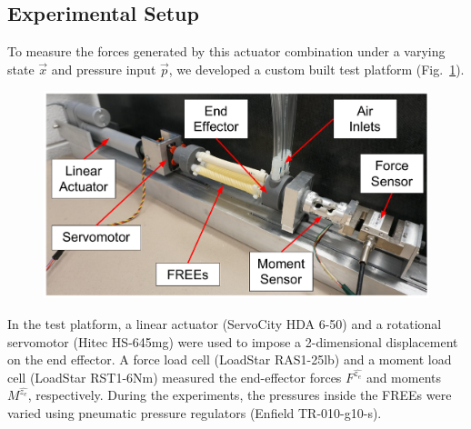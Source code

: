 \subsection{Experimental Setup}
To measure the forces generated by this actuator combination under a varying state $\vec{x}$ and pressure input $\vec{p}$, we developed a custom built test platform (Fig.~\ref{fig:rig}). 
%
\begin{figure}
    \centering
    \includegraphics[width=0.9\linewidth]{figures/photos/rig_labeled.pdf}
    \caption{}
    \label{fig:rig}
\end{figure}
%
In the test platform, a linear actuator (ServoCity HDA 6-50) and a rotational servomotor (Hitec HS-645mg) were used to impose a 2-dimensional displacement on the end effector. 
A force load cell (LoadStar  RAS1-25lb) and a moment load cell (LoadStar RST1-6Nm) measured the end-effector forces $F^{\hat{z_e}}$ and moments $M^{\hat{z_e}}$, respectively.
During the experiments, the pressures inside the FREEs were varied using pneumatic pressure regulators (Enfield TR-010-g10-s). 

